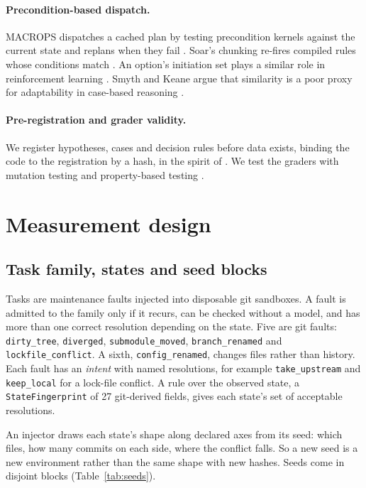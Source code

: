 \documentclass[11pt]{article}
\newcommand{\code}[1]{\texttt{#1}}
\begin{document}
\paragraph{Precondition-based dispatch.}
MACROPS dispatches a cached plan by testing precondition kernels against the current state and
replans when they fail \cite{fikes1972macrops}. Soar's chunking re-fires compiled rules whose
conditions match \cite{laird1986chunking}. An option's initiation set plays a similar role in
reinforcement learning \cite{sutton1999options}. Smyth and Keane argue that similarity is a poor
proxy for adaptability in case-based reasoning \cite{smyth1998adaptation}.

\paragraph{Pre-registration and grader validity.}
We register hypotheses, cases and decision rules before data exists, binding the code to the
registration by a hash, in the spirit of \cite{nosek2018preregistration}. We test the graders
with mutation testing \cite{jia2011mutation} and property-based testing
\cite{maciver2019hypothesis}.

\section{Measurement design}
\label{sec:design}

\subsection{Task family, states and seed blocks}

Tasks are maintenance faults injected into disposable git sandboxes. A fault is admitted to the
family only if it recurs, can be checked without a model, and has more than one correct
resolution depending on the state. Five are git faults: \code{dirty\_tree}, \code{diverged},
\code{submodule\_moved}, \code{branch\_renamed} and \code{lockfile\_conflict}. A sixth,
\code{config\_renamed}, changes files rather than history. Each fault has an \emph{intent} with
named resolutions, for example \code{take\_upstream} and \code{keep\_local} for a lock-file
conflict. A rule over the observed state, a \code{StateFingerprint} of 27 git-derived
fields, gives each state's set of acceptable resolutions.

An injector draws each state's shape along declared axes from its seed: which files, how many
commits on each side, where the conflict falls. So a new seed is a new environment rather than
the same shape with new hashes. Seeds come in disjoint blocks (Table~\ref{tab:seeds}).
\end{document}
